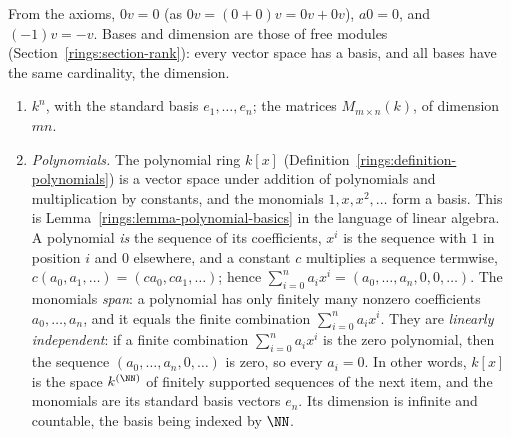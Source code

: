 From the axioms, $0v = 0$ (as $0v = (0 + 0)v = 0v + 0v$), $a0 = 0$, and $(-1)v = -v$. Bases and dimension are those of free modules (Section~\ref{rings:section-rank}): every vector space
has a basis, and all bases have the same cardinality, the dimension.

\begin{example}\label{linear-algebra:example-vector-spaces}
\begin{enumerate}
\item $k^n$, with the standard basis $e_1, \ldots, e_n$; the matrices $M_{m \times n}(k)$, of dimension $mn$.
\item \emph{Polynomials.} The polynomial ring $k[x]$ (Definition~\ref{rings:definition-polynomials}) is a vector space under addition of polynomials and multiplication by constants, and the monomials
$1, x, x^2, \ldots$ form a basis. This is Lemma~\ref{rings:lemma-polynomial-basics} in the language of linear algebra. A polynomial \emph{is} the sequence of its coefficients, $x^i$ is the sequence with $1$ in position $i$
and $0$ elsewhere, and a constant $c$ multiplies a sequence termwise, $c(a_0, a_1, \ldots) = (ca_0, ca_1, \ldots)$; hence $\sum_{i=0}^na_ix^i = (a_0, \ldots, a_n, 0, 0, \ldots)$. The monomials \emph{span}: a polynomial has
only finitely many nonzero coefficients $a_0, \ldots, a_n$, and it equals the finite combination $\sum_{i=0}^na_ix^i$. They are \emph{linearly independent}: if a finite combination $\sum_{i=0}^na_ix^i$ is the zero
polynomial, then the sequence $(a_0, \ldots, a_n, 0, \ldots)$ is zero, so every $a_i = 0$. In other words, $k[x]$ is the space $k^{(\NN)}$ of finitely supported sequences of the next item, and the monomials are its standard
basis vectors $e_n$. Its dimension is infinite and countable, the basis being indexed by $\NN$.


\end{enumerate}
\end{example}
